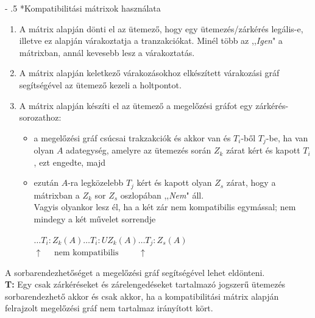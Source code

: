 \documentclass[12pt,margin=0px]{article}
\makeatletter
\renewcommand\paragraph{%
	\@startsection{paragraph}{4}{0mm}%
	{-\baselineskip}%
	{.5\baselineskip}%
	{\normalfont\normalsize\bfseries}}
\makeatother
\begin{document}
    \paragraph*{Kompatibilitási mátrixok használata}
    \begin{enumerate}
        \item A mátrix alapján dönti el az ütemező, hogy egy ütemezés/zárkérés legális-e, illetve ez alapján várakoztatja a tranzakciókat. Minél több az ,,\emph{Igen}" a mátrixban, annál kevesebb lesz a várakoztatás.
        \item A mátrix alapján keletkező várakozásokhoz elkészített várakozási gráf segítségével az ütemező kezeli a holtpontot.
        \item A mátrix alapján készíti el az ütemező a megelőzési gráfot egy zárkérés-sorozathoz:
        \begin{itemize}
            \item a megelőzési gráf csúcsai trakzakciók és akkor van és $T_i$-ből $T_j$-be, ha van olyan $A$ adategység, amelyre az ütemezés során $Z_k$ zárat kért és kapott $T_i$, ezt engedte, majd
            \item ezután $A$-ra legközelebb $T_j$ kért és kapott olyan $Z_{s}$ zárat, hogy a mátrixban a $Z_k$ sor $Z_{s}$ oszlopában ,,\emph{Nem}" áll.\\
            Vagyis olyankor lesz él, ha a két zár nem kompatibilis egymással; nem mindegy a két művelet sorrendje\\
            \begin{center}
                $\ldots T_i:Z_k(A) \ldots T_i:UZ_k(A) \ldots T_j:Z_s(A)$\\
                $\uparrow \quad \text{ nem kompatibilis } \qquad \uparrow$
            \end{center}
        \end{itemize}
    \end{enumerate}
	
    \noindent A sorbarendezhetőséget a megelőzési gráf segítségével lehet eldönteni.\\

    \noindent \textbf{T:} Egy csak zárkéréseket és zárelengedéseket tartalmazó jogszerű ütemezés sorbarendezhető akkor és csak akkor, ha a kompatibilitási mátrix alapján felrajzolt megelőzési gráf nem tartalmaz irányított kört.
\end{document}
